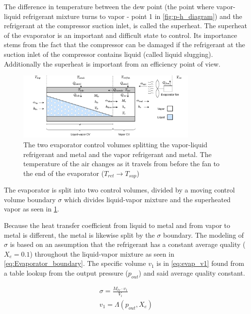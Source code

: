 The difference in temperature between the dew point (the point where vapor-liquid refrigerant mixture turns to vapor - point 1 in \cref{fig:p-h_diagram}) and the refrigerant at the compressor suction inlet, is called the superheat. The superheat of the evaporator is an important and difficult state to control. Its importance stems from the fact that the compressor can be damaged if the refrigerant at the suction inlet of the compressor contains liquid (called liquid slugging). Additionally the superheat is important from an efficiency point of view. 

\begin{figure}[h!]
	\centering
	\includegraphics[width=0.8\textwidth]{Graphics/Evaporator_CV_diagram.pdf}
	\caption{The two evaporator control volumes splitting the vapor-liquid refrigerant and metal and the vapor refrigerant and metal. The temperature of the air changes as it travels from before the fan to the end of the evaporator ($T_{ret} \rightarrow T_{sup}$)}
	\label{fig:evap_CV}
\end{figure}

The evaporator is split into two control volumes, divided by a moving control volume boundary $\sigma$ which divides liquid-vapor mixture and the superheated vapor as seen in \cref{fig:evap_CV}.

Because the heat transfer coefficient from liquid to metal and from vapor to metal is different, the metal is likewise split by the $\sigma$ boundary. The modeling of $\sigma$ is based on an assumption that the refrigerant has a constant average quality ($X_e = 0.1$) throughout the liquid-vapor mixture as seen in \cref{eq:Evaporator_boundary}. The specific volume $v_1$ is in \cref{eq:evap_v1} found from a table lookup from the output pressure ($p_{out}$) and said average quality constant.

\begin{align}
	\sigma = \frac{M_{lv} \cdot v_1}{V_i} \label{eq:Evaporator_boundary} \\
	v_1 = \Lambda(p_{out},X_e) \label{eq:evap_v1}
\end{align}

